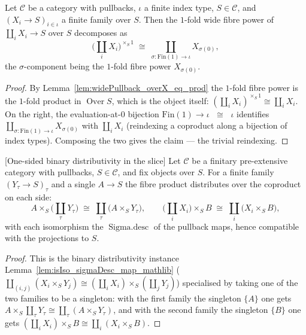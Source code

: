 \begin{lemma}\leanok
  \label{lem:coproduct_distrib_fibrePower_zero}
  Let \(\mathcal{C}\) be a category with pullbacks, \(\iota\) a finite index type, \(S \in
  \mathcal{C}\), and \((X_i \to S)_{i \in \iota}\) a finite family over \(S\). Then the \(1\)-fold
  wide fibre power of \(\coprod_i X_i \to S\) over \(S\) decomposes as
  \[
    \bigl(\textstyle\coprod_{i} X_i\bigr)^{\times_S 1}
      \;\cong\;
    \coprod_{\sigma : \mathrm{Fin}(1) \to \iota} X_{\sigma(0)},
  \]
  the \(\sigma\)-component being the \(1\)-fold fibre power \(X_{\sigma(0)}\).
\end{lemma}
\begin{proof}
  By Lemma~\ref{lem:widePullback_overX_eq_prod} the \(1\)-fold fibre power is the \(1\)-fold product
  in \(\operatorname{Over} S\), which is the object itself: \((\coprod_i X_i)^{\times_S 1} \cong
  \coprod_i X_i\). On the right, the evaluation-at-\(0\) bijection \(\mathrm{Fin}(1) \to \iota\)
  \(\;\cong\;\) \(\iota\) identifies \(\coprod_{\sigma : \mathrm{Fin}(1)\to\iota} X_{\sigma(0)}\)
  with \(\coprod_i X_i\) (reindexing a coproduct along a bijection of index types). Composing the
  two gives the claim --- the trivial reindexing.
\end{proof}

\begin{lemma}

[One-sided binary distributivity in the slice]
  \label{lem:prod_coproduct_distrib}
  Let \(\mathcal{C}\) be a finitary pre-extensive category with pullbacks, \(S \in \mathcal{C}\), and
  fix objects over \(S\). For a finite family \((Y_\tau \to S)_\tau\) and a single \(A \to S\) the
  fibre product distributes over the coproduct on each side:
  \[
    A \times_S \bigl(\textstyle\coprod_{\tau} Y_\tau\bigr)
      \;\cong\;
    \coprod_{\tau} \bigl(A \times_S Y_\tau\bigr),
    \qquad
    \bigl(\textstyle\coprod_{i} X_i\bigr) \times_S B
      \;\cong\;
    \coprod_{i} \bigl(X_i \times_S B\bigr),
  \]
  with each isomorphism the \(\operatorname{Sigma.desc}\) of the pullback maps, hence compatible with
  the projections to \(S\).
\end{lemma}
\begin{proof}
  This is the binary distributivity instance Lemma~\ref{lem:isIso_sigmaDesc_map_mathlib}
  (\(\coprod_{(i,j)}(X_i \times_S Y_j) \cong (\coprod_i X_i)\times_S(\coprod_j Y_j)\)) specialised by
  taking one of the two families to be a singleton: with the first family the singleton \(\{A\}\)
  one gets \(A \times_S \coprod_\tau Y_\tau \cong \coprod_\tau (A \times_S Y_\tau)\), and with the
  second family the singleton \(\{B\}\) one gets \((\coprod_i X_i)\times_S B \cong \coprod_i (X_i
  \times_S B)\).
\end{proof}

